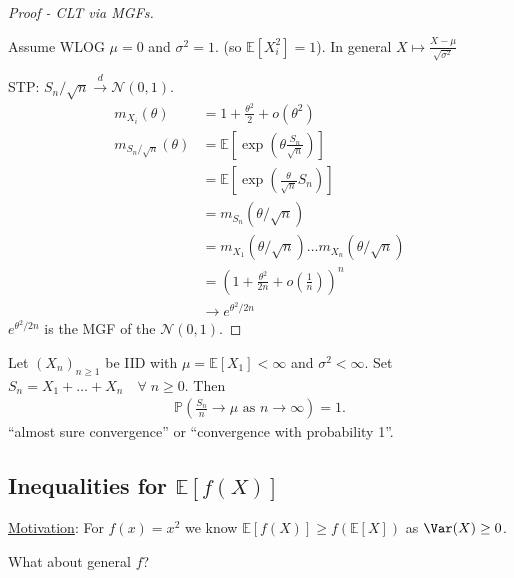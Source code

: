 \begin{proof}[Proof - CLT via MGFs] ~

    Assume WLOG $\mu = 0$ and $\sigma^2 = 1$. (so $\mathbb{E}[X_i^2] = 1$). 
    In general $X \mapsto \frac{X - \mu}{\sqrt{\sigma^2}}$

    STP: $S_n / \sqrt{n} \overset{d}{\to} \mathcal{N}(0, 1)$.
    \begin{align*}
        m_{X_i}(\theta) &= 1 + \frac{\theta^2}{2} + o(\theta^2) \\
        m_{S_n / \sqrt{n}}(\theta) &= \mathbb{E}\left[\exp \left( \theta \frac{S_n}{\sqrt{n}} \right) \right] \\
        &= \mathbb{E}\left[\exp \left( \frac{\theta}{\sqrt{n}} S_n \right) \right] \\
        &= m_{S_n}(\theta / \sqrt{n}) \\
        &= m_{X_1}(\theta / \sqrt{n}) \dots m_{X_n}(\theta / \sqrt{n}) \\
        &= \left( 1 +  \frac{\theta^2}{2n} + o \left( \frac{1}{n} \right) \right)^n \\
        &\to e^{\theta^2 / 2n}
    \end{align*} 
    $e^{\theta^2 / 2n}$ is the MGF of the $\mathcal{N}(0, 1)$.
\end{proof} 

\begin{theorem}
    Let $(X_n)_{n \geq 1}$ be IID with $\mu = \mathbb{E}[X_1] < \infty$ and $\sigma^2 < \infty$. 
    Set $S_n = X_1 + \dots + X_n \quad \forall \; n \geq 0$.
    Then
    \begin{align*}
        \mathbb{P}\left( \frac{S_n}{n} \to \mu \text{ as } n \to \infty \right) = 1.
    \end{align*} 
    \color{blue} ``almost sure convergence'' or ``convergence with probability 1''.
\end{theorem} 

\subsection{Inequalities for $\mathbb{E}[f(X)]$}
\underline{Motivation}: For $f(x) = x^2$ we know $\mathbb{E}[f(X)] \geq f(\mathbb{E}[X])$ as $\Var(X) \geq 0$.

\begin{question}
    What about general $f$?
\end{question} 

